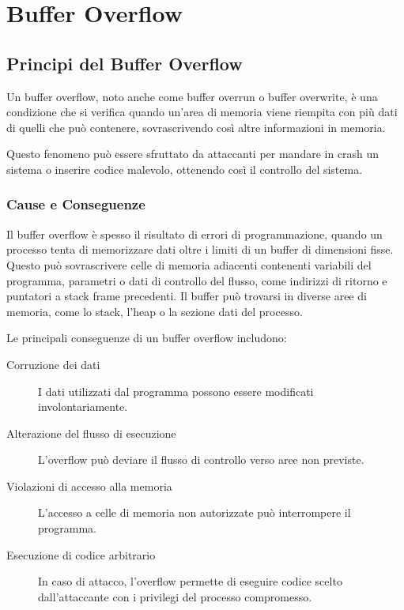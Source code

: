 \chapter{Buffer Overflow}

\section{Principi del Buffer Overflow}

Un buffer overflow, noto anche come buffer overrun o buffer overwrite, è una condizione che si verifica quando un'area di memoria viene riempita con più dati di quelli che può contenere, sovrascrivendo così altre informazioni in memoria.

Questo fenomeno può essere sfruttato da attaccanti per mandare in crash un sistema o inserire codice malevolo, ottenendo così il controllo del sistema.

\subsection{Cause e Conseguenze}

Il buffer overflow è spesso il risultato di errori di programmazione, quando un processo tenta di memorizzare dati oltre i limiti di un buffer di dimensioni fisse. Questo può sovrascrivere celle di memoria adiacenti contenenti variabili del programma, parametri o dati di controllo del flusso, come indirizzi di ritorno e puntatori a stack frame precedenti. Il buffer può trovarsi in diverse aree di memoria, come lo stack, l'heap o la sezione dati del processo.

Le principali conseguenze di un buffer overflow includono:

\begin{description}
    \item[Corruzione dei dati] I dati utilizzati dal programma possono essere modificati involontariamente.
    
    \item[Alterazione del flusso di esecuzione] L'overflow può deviare il flusso di controllo verso aree non previste.
    
    \item[Violazioni di accesso alla memoria] L'accesso a celle di memoria non autorizzate può interrompere il programma.
    
    \item[Esecuzione di codice arbitrario] In caso di attacco, l'overflow permette di eseguire codice scelto dall'attaccante con i privilegi del processo compromesso.
\end{description}

